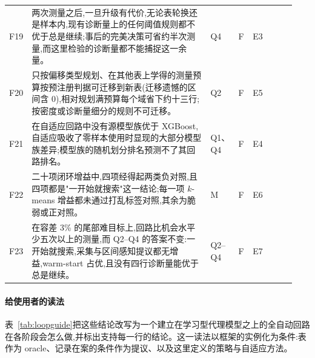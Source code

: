 \documentclass[11pt,a4paper]{ctexart}
\begin{document}
{\begin{longtable}{@{}p{0.04\linewidth}p{0.625\linewidth}p{0.075\linewidth}p{0.055\linewidth}p{0.15\linewidth}@{}}
F19 & 两次测量之后,一旦升级有代价,无论表轮换还是样本内,现有诊断量上的任何阈值规则都不优于总是继续;事后的完美决策可省约半次测量,而这里检验的诊断量都不能捕捉这一余量。 & Q4 & F & E3 \\
F20 & 只按偏移类型规划、在其他表上学得的测量预算按预注册判据可迁移到新表(迁移遗憾的区间含 0),相对规划满预算每个域省下约十三行;按密度或诊断量细分的规则不可迁移。 & Q2 & F & E5 \\
F21 & 在自适应回路中没有源模型族优于 XGBoost,自适应吸收了零样本使用时显现的大部分模型族差异;模型族的随机划分排名预测不了其回路排名。 & Q1、Q4 & F & E4 \\
F22 & 二十项闭环增益中,四项经得起两类负对照,且四项都是"一开始就搜索"这一结论;每一项 $k$-means 增益都未通过打乱标签对照,其余为脆弱或正对照。 & M & F & E6 \\
F23 & 在容差 3\% 的尾部难目标上,回路比机会水平少五次以上的测量,而 Q2--Q4 的答案不变:一开始就搜索,采集与区间感知提议都无增益,warm-start 占优,且没有四行诊断量能优于总是继续。 & Q2--Q4 & F & E7 \\
\end{longtable}
}

\paragraph{给使用者的读法} 表~\ref{tab:loopguide}把这些结论改写为一个建立在学习型代理模型之上的全自动回路在各阶段会怎么做,并标出支持每一行的结论。这一读法以框架的实例化为条件:表作为 oracle、记录在案的条件作为提议、以及这里定义的策略与自适应方法。
\end{document}
